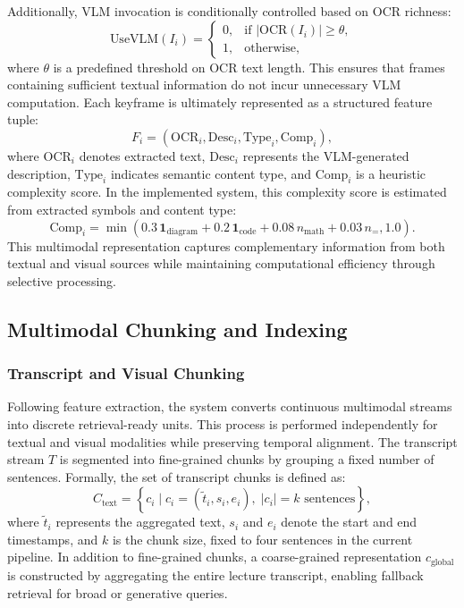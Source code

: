 \documentclass[conference]{IEEEtran}
\begin{document}
    Additionally, VLM invocation is conditionally controlled based on OCR richness:
    \begin{equation}
    \text{UseVLM}(I_i)=
    \begin{cases}
    0, & \text{if } |\text{OCR}(I_i)| \geq \theta, \\
    1, & \text{otherwise},
    \end{cases}
    \end{equation}
    where $\theta$ is a predefined threshold on OCR text length. This ensures that frames containing sufficient textual information do not incur unnecessary VLM computation. Each keyframe is ultimately represented as a structured feature tuple:
    \begin{equation}
    F_i = \left(\text{OCR}_i, \text{Desc}_i, \text{Type}_i, \text{Comp}_i\right),
    \end{equation}
    where $\text{OCR}_i$ denotes extracted text, $\text{Desc}_i$ represents the VLM-generated description, $\text{Type}_i$ indicates semantic content type, and $\text{Comp}_i$ is a heuristic complexity score. In the implemented system, this complexity score is estimated from extracted symbols and content type:
    \begin{equation}
    \text{Comp}_i = \min\left(0.3\,\mathbf{1}_{\text{diagram}} + 0.2\,\mathbf{1}_{\text{code}} + 0.08\,n_{\text{math}} + 0.03\,n_{=}, 1.0\right).
    \end{equation}
    This multimodal representation captures complementary information from both textual and visual sources while maintaining computational efficiency through selective processing.

    \subsection{Multimodal Chunking and Indexing}

    \subsubsection{Transcript and Visual Chunking}

    Following feature extraction, the system converts continuous multimodal streams into discrete retrieval-ready units. This process is performed independently for textual and visual modalities while preserving temporal alignment. The transcript stream $T$ is segmented into fine-grained chunks by grouping a fixed number of sentences. Formally, the set of transcript chunks is defined as:
    \begin{equation}
    C_{\text{text}} = \left\{c_i \mid c_i = (\tilde{t}_i, s_i, e_i), \; |c_i| = k \text{ sentences}\right\},
    \end{equation}
    where $\tilde{t}_i$ represents the aggregated text, $s_i$ and $e_i$ denote the start and end timestamps, and $k$ is the chunk size, fixed to four sentences in the current pipeline. In addition to fine-grained chunks, a coarse-grained representation $c_{\text{global}}$ is constructed by aggregating the entire lecture transcript, enabling fallback retrieval for broad or generative queries.
\end{document}
